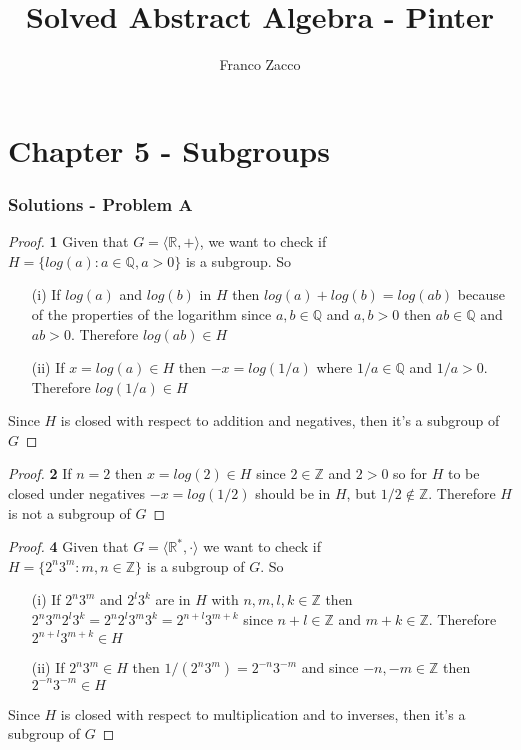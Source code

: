 \documentclass[11pt]{article}
\title{\textbf{Solved Abstract Algebra - Pinter}}
\author{Franco Zacco}
\date{}
\begin{document}
\maketitle
\thispagestyle{empty}

\section*{Chapter 5 - Subgroups}

	\subsubsection*{Solutions - Problem A}
	\begin{proof}{\textbf{1}}
		Given that $G = \langle \mathbb{R}, + \rangle$, we want to check if \\
		$H = \{log(a): a \in \mathbb{Q}, a > 0\}$ is a subgroup. So
		\begin{itemize}
			\item[(i)] If $log(a)$ and $log(b)$ in $H$ then $log(a)+log(b) = log(ab)$ because of the properties of the logarithm since $a,b \in \mathbb{Q}$ and $a,b > 0$ then $ab \in \mathbb{Q}$ and $ab > 0$. Therefore $log(ab) \in H$
			\item[(ii)] If $x=log(a) \in H$ then $-x = log(1/a)$ where $1/a \in \mathbb{Q}$ and $1/a > 0$. Therefore $log(1/a) \in H$
		\end{itemize}
		Since $H$ is closed with respect to addition and negatives, then it's a subgroup of $G$
	\end{proof}
	\begin{proof}{\textbf{2}}
		If $n=2$ then $x=log(2) \in H$ since $2 \in \mathbb{Z}$ and $2 > 0$ so for $H$ to be closed under negatives $-x=log(1/2)$ should be in $H$, but $1/2 \notin \mathbb{Z}$. Therefore $H$ is not a subgroup of $G$
	\end{proof}
	\begin{proof}{\textbf{4}}
		Given that $G = \langle \mathbb{R}^{*}, \cdot \rangle$ we want to check if \\
		$H = \{2^{n}3^{m}: m,n \in \mathbb{Z}\}$ is a subgroup of $G$. So
		\begin{itemize}
			\item[(i)] If $2^{n}3^{m}$ and $2^{l}3^{k}$ are in $H$ with $n,m,l,k \in \mathbb{Z}$ then\\
			$2^{n}3^{m}2^{l}3^{k} = 2^{n}2^{l}3^{m}3^{k} = 2^{n+l}3^{m+k}$ since $n+l \in \mathbb{Z}$ and $m+k \in \mathbb{Z}$. Therefore $2^{n+l}3^{m+k} \in H$
			\item[(ii)] If $2^{n}3^{m} \in H$ then $1/(2^{n}3^{m}) = 2^{-n}3^{-m}$ and since $-n,-m \in \mathbb{Z}$ then $2^{-n}3^{-m} \in H$
		\end{itemize}
		Since $H$ is closed with respect to multiplication and to inverses, then it's a subgroup of $G$
	\end{proof}
\end{document}

